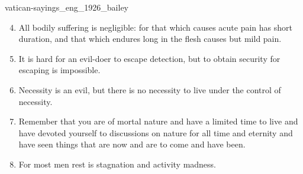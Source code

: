 \documentclass{stex}
\begin{document}
\begin{smodule}{vatican-sayings_eng_1926_bailey}


\begin{sparagraph}[id=vatican-sayings,name={Vatican Sayings}]
  \begin{enumerate}[listparindent=0cm]
    \setcounter{enumi}{3}

    \item\begin{sparagraph}[id=saying:04,name=Vatican Saying 4]
      All bodily suffering is negligible: for that which causes acute pain has short duration, and that which endures long in the flesh causes but mild pain.
    \end{sparagraph}

    \setcounter{enumi}{6}

    \item\begin{sparagraph}[id=saying:07,name=Vatican Saying 7]
      It is hard for an evil-doer to escape detection, but to obtain security for escaping is impossible.
    \end{sparagraph}

    \setcounter{enumi}{8}

    \item\begin{sparagraph}[id=saying:09,name=Vatican Saying 9]
      Necessity is an evil, but there is no necessity to live under the control of necessity.
    \end{sparagraph}

    \item\begin{sparagraph}[id=saying:10,name=Vatican Saying 10]
      Remember that you are of mortal nature and have a limited time to live and have devoted yourself to discussions on nature for all time and eternity and have seen things that are now and are to come and have been.
    \end{sparagraph}

    \item\begin{sparagraph}[id=saying:11,name=Vatican Saying 11]
      For most men rest is stagnation and activity madness.
    \end{sparagraph}


\end{enumerate}
\end{sparagraph}
\end{smodule}
\end{document}
